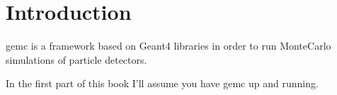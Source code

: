 \section{Introduction}
gemc is a framework based on Geant4 libraries in order to run MonteCarlo simulations of particle detectors.



In the first part of this book I'll assume you have gemc up and running.



